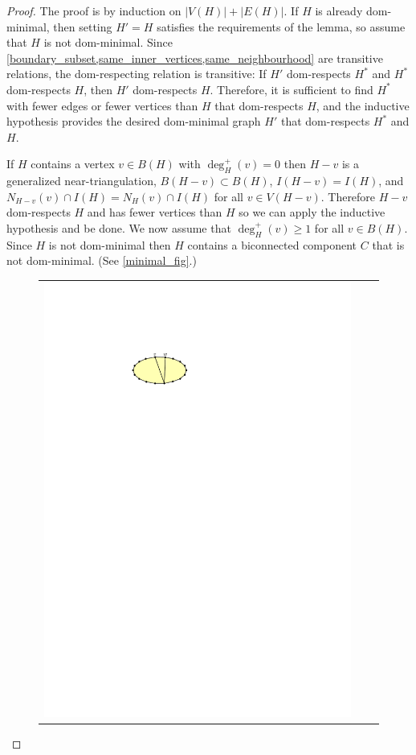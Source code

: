 \documentclass{article}
\theoremstyle{definition}
\begin{document}
\begin{proof}
  The proof is by induction on $|V(H)|+|E(H)|$.  If $H$ is already dom-minimal, then setting $H'=H$ satisfies the requirements of the lemma, so assume that $H$ is not dom-minimal.  Since \cref{boundary_subset,same_inner_vertices,same_neighbourhood} are transitive relations, the dom-respecting relation is transitive: If $H'$ dom-respects $H^*$ and $H^*$ dom-respects $H$, then $H'$ dom-respects $H$.  Therefore, it is sufficient to find $H^*$ with fewer edges or fewer vertices than $H$ that dom-respects $H$, and the inductive hypothesis provides the desired dom-minimal graph $H'$ that dom-respects $H^*$ and $H$.

  If $H$ contains a vertex $v\in B(H)$ with $\deg^+_H(v)=0$ then $H-v$ is a generalized near-triangulation, $B(H-v)\subset B(H)$, $I(H-v)=I(H)$, and $N_{H-v}(v)\cap I(H)=N_{H}(v)\cap I(H)$ for all $v\in V(H-v)$. Therefore $H-v$ dom-respects $H$ and has fewer vertices than $H$ so we can apply the inductive hypothesis and be done.  We now assume that $\deg^+_H(v)\ge 1$ for all $v\in B(H)$.  Since $H$ is not dom-minimal then $H$ contains a biconnected component $C$ that is not dom-minimal. (See \cref{minimal_fig}.)
  \begin{figure}
    \centering
    \begin{tabular}{ccc}
      \includegraphics[page=1]{figs/minimal} &

\end{tabular}
\end{figure}
\end{proof}
\end{document}
